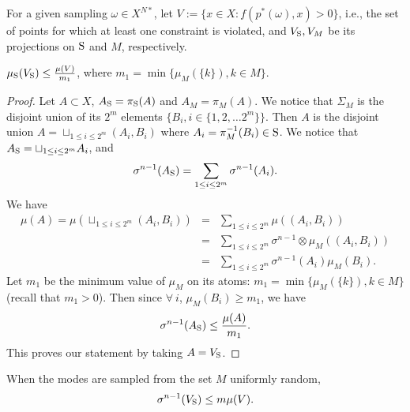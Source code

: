 For a given sampling $\omega \in X^{N*}$, let $V:=\{x \in X: f(p^*(\omega),x) > 0\}$, i.e., the set of points for which at least one constraint is violated, and $V_{\text{S}}, V_M$ be its projections on $\text{S}$ and $M$, respectively. 

\begin{lemma}$\mu_{\text{S}}(V_{\text{S}}) \leq \frac{\mu(V)}{m_1}$, where $m_1 = \min \{\mu_M(\{k\}), k \in M\}$.\end{lemma}
\begin{proof}

Let $A \subset X$, $A_{\text{S}} = \pi_{\text{S}} (A)$ and $A_M = \pi_M (A)$. We notice that $\Sigma_M$ is the disjoint union of its $2^m$ elements $\{B_i, i \in \{1,2, \ldots 2^m\} \}$. Then $A$ is the disjoint union $A = \sqcup_{1 \leq i \leq 2^m} (A_i, B_i)$ where $A_i = \pi_M^{-1} (B_i) \in \text{S}$. We notice that 
$A_{\text{S}} = \sqcup_{1 \leq i \leq 2^m} A_i$, 
and
\begin{equation*}
\sigma^{n-1} (A_{\text{S}}) = \sum_{1 \leq i \leq 2^m} \sigma^{n-1} (A_i).
\end{equation*}
We have 
\begin{eqnarray*}
\mu(A) = \mu(\sqcup_{1 \leq i \leq 2^m} (A_i, B_i)) &=& \sum_{1 \leq i \leq 2^m} \mu( (A_i, B_i)) \\
 &=& \sum_{1 \leq i \leq 2^m} \sigma^{n-1} \otimes \mu_M ((A_i, B_i)) \\
 & = &\sum_{1 \leq i \leq 2^m} \sigma^{n-1}(A_i) \mu_M (B_i).
\end{eqnarray*}
Let $m_1$ be the minimum value  of $\mu_M$ on its atoms: $m_1 = \min \{\mu_M(\{k\}), k \in M\}$ (recall that $m_1 > 0$). Then since $ \forall \ i$, $\mu_M(B_i) \geq m_1$, we have
\begin{equation}
\sigma^{n-1}(A_{\text{S}}) \leq \frac{\mu(A)}{m_1}.
\end{equation}
This proves our statement by taking $A = V_{\text{S}}$.
\end{proof}

\begin{corollary} \label{cor:measure}When the modes are sampled from the set $M$ uniformly random, 
\begin{equation*}\sigma^{n-1}(V_{\text{S}}) \leq m \mu(V). \end{equation*}
\end{corollary}

